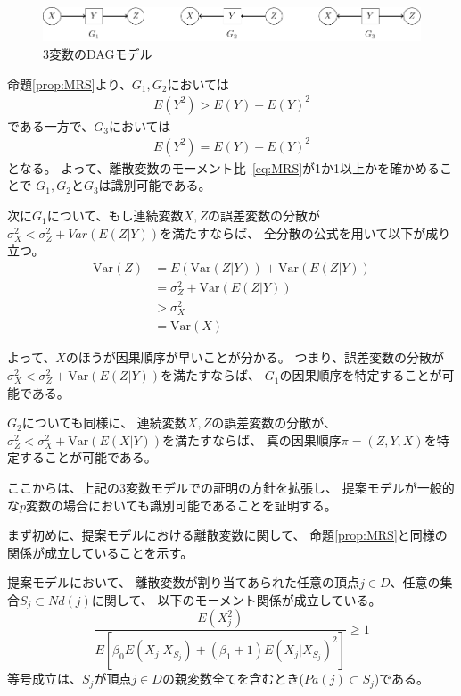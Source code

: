 \begin{figure}[ht]
  \centering
  \includegraphics{./picture/prop_three_variate.pdf}
  \caption{3変数のDAGモデル}
  \label{fig:prop_three_variate}
\end{figure}

命題\ref{prop:MRS}より、$G_1, G_2$においては
\begin{align*}
  E(Y^2) > E(Y) + E(Y)^2
\end{align*}
である一方で、$G_3$においては
\begin{align*}
  E(Y^2) = E(Y) + E(Y)^2
\end{align*}
となる。
よって、離散変数のモーメント比~\eqref{eq:MRS}が1か1以上かを確かめることで
$G_1, G_2$と$G_3$は識別可能である。

次に$G_1$について、もし連続変数$X, Z$の誤差変数の分散が
$\sigma_X^2 < \sigma_Z^2 + \mathit{Var}(E(Z|Y))$を満たすならば、
全分散の公式を用いて以下が成り立つ。
\begin{align*}
  \mathrm{Var}(Z) &= E(\mathrm{Var}(Z|Y)) + \mathrm{Var}(E(Z|Y)) \\
                  &= \sigma_Z^2 + \mathrm{Var}(E(Z|Y)) \\
                  &> \sigma_X^2 \\
                  &= \mathrm{Var}(X)
\end{align*}

よって、$X$のほうが因果順序が早いことが分かる。
つまり、誤差変数の分散が$\sigma_X^2 < \sigma_Z^2 + \mathrm{Var}(E(Z|Y))$を満たすならば、
$G_1$の因果順序を特定することが可能である。

$G_2$についても同様に、
連続変数$X, Z$の誤差変数の分散が、
$\sigma_Z^2 < \sigma_X^2 + \mathrm{Var}(E(X|Y))$を満たすならば、
真の因果順序$\pi = (Z, Y, X)$を特定することが可能である。


ここからは、上記の3変数モデルでの証明の方針を拡張し、
提案モデルが一般的な$p$変数の場合においても識別可能であることを証明する。

まず初めに、提案モデルにおける離散変数に関して、
命題\ref{prop:MRS}と同様の関係が成立していることを示す。

\begin{lemm}
  提案モデルにおいて、
  離散変数が割り当てあられた任意の頂点$j \in D$、任意の集合$S_j \subset \mathit{Nd}(j)$に関して、
  以下のモーメント関係が成立している。
  \begin{equation}
    \frac{E(X_j^2)}
    {E \left[ \beta_0 E(X_j | X_{S_j}) + (\beta_1 + 1)E(X_j | X_{S_j})^2 \right]}
    \geq 1
    \label{prop_MRS}
  \end{equation}
  等号成立は、$S_j$が頂点$j \in D$の親変数全てを含むとき($Pa(j) \subset S_j$)である。
  \label{lem_prop_MRS}
\end{lemm}

